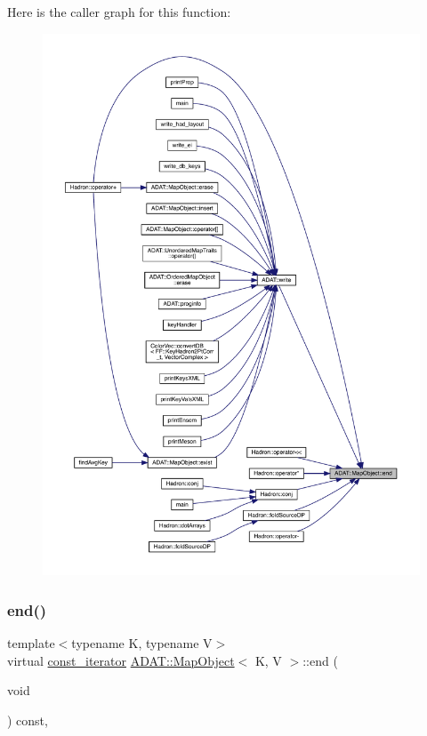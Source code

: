 Here is the caller graph for this function\+:
\nopagebreak
\begin{figure}[H]
\begin{center}
\leavevmode
\includegraphics[width=350pt]{da/d29/classADAT_1_1MapObject_a1162459ba16798247ab64ee38be25bca_icgraph}
\end{center}
\end{figure}
\mbox{\label{classADAT_1_1MapObject_a1162459ba16798247ab64ee38be25bca}} 
\subsubsection{\texorpdfstring{end()}{end()}\hspace{0.1cm}{\footnotesize\ttfamily [3/3]}}
{\footnotesize\ttfamily template$<$typename K, typename V$>$ \\
virtual \mbox{\hyperlink{classADAT_1_1MapObject_a4622cd7d3b6fed18fe226d28091cc6c8}{const\+\_\+iterator}} \mbox{\hyperlink{classADAT_1_1MapObject}{A\+D\+A\+T\+::\+Map\+Object}}$<$ K, V $>$\+::end (\begin{DoxyParamCaption}\item[{void}]{ }\end{DoxyParamCaption}) const\hspace{0.3cm}{\ttfamily [inline]}, {\ttfamily [virtual]}}




